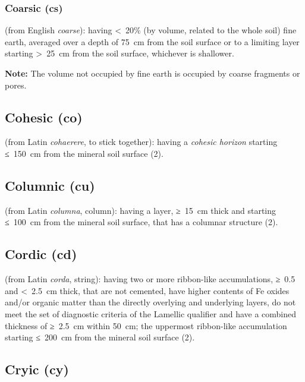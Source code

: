 \documentclass[
  letterpaper,
  DIV=11,
  numbers=noendperiod]{scrreprt}
\begin{document}
\hypertarget{coarsic-cs}{%
\subsubsection{Coarsic (cs)}\label{coarsic-cs}}

(from English \emph{coarse}): having \textless~20\% (by volume, related
to the whole soil) fine earth, averaged over a depth of 75~cm from the
soil surface or to a limiting layer starting \textgreater~25~cm from the
soil surface, whichever is shallower.

\textbf{Note:} The volume not occupied by fine earth is occupied by
coarse fragments or pores.

\hypertarget{cohesic-co}{%
\subsection{Cohesic (co)}\label{cohesic-co}}

(from Latin \emph{cohaerere}, to stick together): having a \emph{cohesic
horizon} starting ≤~150~cm from the mineral soil surface (2).

\hypertarget{columnic-cu}{%
\subsection{Columnic (cu)}\label{columnic-cu}}

(from Latin \emph{columna}, column): having a layer, ≥~15~cm thick and
starting ≤~100~cm from the mineral soil surface, that has a columnar
structure (2).

\hypertarget{cordic-cd}{%
\subsection{Cordic (cd)}\label{cordic-cd}}

(from Latin \emph{corda}, string): having two or more ribbon-like
accumulations, ≥~0.5 and \textless~2.5~cm thick, that are not cemented,
have higher contents of Fe oxides and/or organic matter than the
directly overlying and underlying layers, do not meet the set of
diagnostic criteria of the Lamellic qualifier and have a combined
thickness of ≥~2.5~cm within 50~cm; the uppermost ribbon-like
accumulation starting ≤~200~cm from the mineral soil surface (2).

\hypertarget{cryic-cy}{%
\subsection{Cryic (cy)}\label{cryic-cy}}
\end{document}
